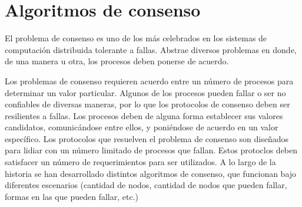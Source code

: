 

\section{Algoritmos de consenso}\label{subsubsec:consensus}
El problema de consenso es uno de los más celebrados en los sistemas de computación distribuida tolerante a fallas.
%
Abstrae diversos problemas en donde, de una manera u otra, los procesos deben ponerse de acuerdo.
%

Los problemas de consenso requieren acuerdo entre un número de procesos para determinar un valor particular.
%
Algunos de los procesos pueden fallar o ser no confiables de diversas maneras, por lo que los protocolos de
consenso deben ser resilientes a fallas.
%
Los procesos deben de alguna forma establecer sus valores candidatos, comunicándose entre ellos, y
poniéndose de acuerdo en un valor específico.
%
Los protocolos que resuelven el problema de consenso son diseñados para lidiar con un número limitado de procesos
que fallan.
%
Estos protoclos deben satisfacer un número de requerimientos para ser utilizados.
%
A lo largo de la historia se han desarrollado distintos algoritmos de consenso, que funcionan bajo diferentes
escenarios (cantidad de nodos, cantidad de nodos que pueden fallar, formas en las que pueden fallar, etc.)

